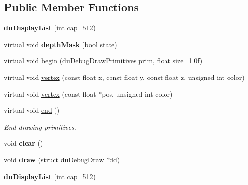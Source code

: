 \subsection*{Public Member Functions}
\begin{DoxyCompactItemize}
\item 
\mbox{\label{classduDisplayList_a841869a8b7db7c4c67470578e3f2e050}} 
{\bfseries du\+Display\+List} (int cap=512)
\item 
\mbox{\label{classduDisplayList_a2bd9a4e455216c4427557a230acfee31}} 
virtual void {\bfseries depth\+Mask} (bool state)
\item 
virtual void \hyperlink{classduDisplayList_a9b22850cbe77c3e59f00ceda818563ea}{begin} (du\+Debug\+Draw\+Primitives prim, float size=1.\+0f)
\item 
virtual void \hyperlink{classduDisplayList_af724f7566b2c1c2c09453dc064c6eecf}{vertex} (const float x, const float y, const float z, unsigned int color)
\item 
virtual void \hyperlink{classduDisplayList_ab4aa562f713485769b68d1989c6e1ec4}{vertex} (const float $\ast$pos, unsigned int color)
\item 
\mbox{\label{classduDisplayList_ad8283f5518c514d0635d8ad0c359e11a}} 
virtual void \hyperlink{classduDisplayList_ad8283f5518c514d0635d8ad0c359e11a}{end} ()
\begin{DoxyCompactList}\small\item\em End drawing primitives. \end{DoxyCompactList}\item 
\mbox{\label{classduDisplayList_a5a6da38566e95882f4b63c0d765b2cc3}} 
void {\bfseries clear} ()
\item 
\mbox{\label{classduDisplayList_a53556c9d2afcd9eb625bc4f4cf9cf648}} 
void {\bfseries draw} (struct \hyperlink{structduDebugDraw}{du\+Debug\+Draw} $\ast$dd)
\item 
\mbox{\label{classduDisplayList_a841869a8b7db7c4c67470578e3f2e050}} 
{\bfseries du\+Display\+List} (int cap=512)
\item 
\mbox{\label{classduDisplayList_aa09c82a1a552e592f65d8f6562e91ec0}} 

\end{DoxyCompactItemize}

